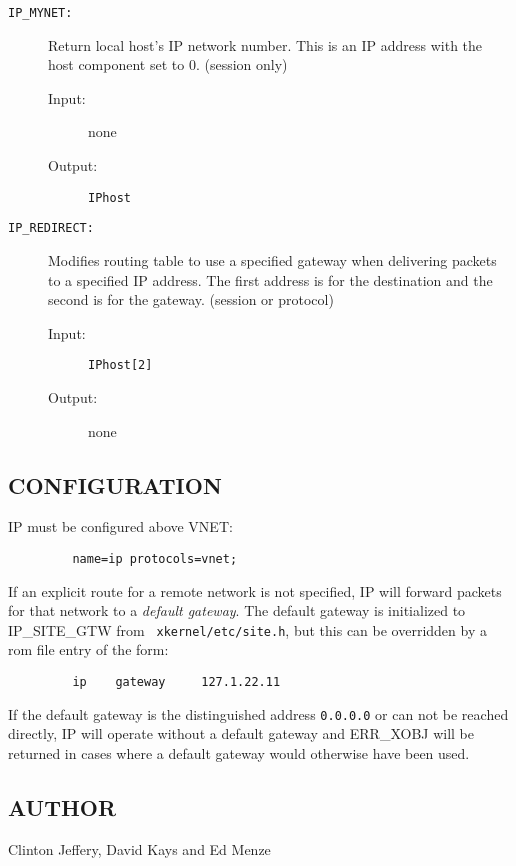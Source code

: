 \begin{description}

\item[{\tt IP\_MYNET:}]
Return local host's IP network number.
This is an IP address with the host
component set to 0.  (session only)
\begin{description}
\item[{\rm Input:}] none
\item[{\rm Output:}] {\tt IPhost}
\end{description}

\item[{\tt IP\_REDIRECT:}] Modifies routing table to use a specified
gateway when delivering packets to a specified IP address.
The first address is for the destination
and the second is for the gateway.  (session or protocol)
\begin{description}
\item[{\rm Input:}] {\tt IPhost[2]}
\item[{\rm Output:}] none
\end{description}

\end{description}

\subsection*{CONFIGURATION}

IP must be configured above VNET:

\begin{verbatim}
         name=ip protocols=vnet;
\end{verbatim}

\medskip

If an explicit route for a remote network is not specified, 
IP will forward packets for that network to a {\em default gateway}.
The default gateway is initialized to IP\_SITE\_GTW from {\tt
xkernel/etc/site.h}, but this can be overridden by a rom file entry of the
form:
\begin{verbatim}
         ip    gateway     127.1.22.11
\end{verbatim}

If the default gateway is the distinguished address {\tt 0.0.0.0} or
can not be reached directly, IP will operate without a default gateway
and ERR\_XOBJ will be returned in cases where a default gateway would
otherwise have been used.

\subsection*{AUTHOR}

\noindent Clinton Jeffery, David Kays and Ed Menze
